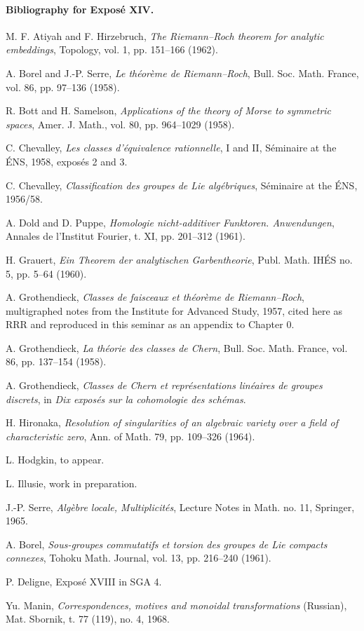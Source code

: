 \documentclass[12pt]{article}
\begin{document}
\paragraph{Bibliography for Exposé XIV.}
\begin{enumerate}[label={[\arabic*]}]
\item M. F. Atiyah and F. Hirzebruch, \emph{The Riemann--Roch theorem for analytic embeddings}, Topology, vol. 1, pp. 151--166 (1962).
\item A. Borel and J.-P. Serre, \emph{Le théorème de Riemann--Roch}, Bull. Soc. Math. France, vol. 86, pp. 97--136 (1958).
\item R. Bott and H. Samelson, \emph{Applications of the theory of Morse to symmetric spaces}, Amer. J. Math., vol. 80, pp. 964--1029 (1958).
\item C. Chevalley, \emph{Les classes d'équivalence rationnelle}, I and II, Séminaire at the ÉNS, 1958, exposés 2 and 3.
\item C. Chevalley, \emph{Classification des groupes de Lie algébriques}, Séminaire at the ÉNS, 1956/58.
\item A. Dold and D. Puppe, \emph{Homologie nicht-additiver Funktoren. Anwendungen}, Annales de l'Institut Fourier, t. XI, pp. 201--312 (1961).
\item H. Grauert, \emph{Ein Theorem der analytischen Garbentheorie}, Publ. Math. IHÉS no. 5, pp. 5--64 (1960).
\item A. Grothendieck, \emph{Classes de faisceaux et théorème de Riemann--Roch}, multigraphed notes from the Institute for Advanced Study, 1957, cited here as RRR and reproduced in this seminar as an appendix to Chapter 0.
\item A. Grothendieck, \emph{La théorie des classes de Chern}, Bull. Soc. Math. France, vol. 86, pp. 137--154 (1958).
\item A. Grothendieck, \emph{Classes de Chern et représentations linéaires de groupes discrets}, in \emph{Dix exposés sur la cohomologie des schémas}.
\item H. Hironaka, \emph{Resolution of singularities of an algebraic variety over a field of characteristic zero}, Ann. of Math. 79, pp. 109--326 (1964).
\item L. Hodgkin, to appear.
\item L. Illusie, work in preparation.
\item J.-P. Serre, \emph{Algèbre locale, Multiplicités}, Lecture Notes in Math. no. 11, Springer, 1965.
\item A. Borel, \emph{Sous-groupes commutatifs et torsion des groupes de Lie compacts connexes}, Tohoku Math. Journal, vol. 13, pp. 216--240 (1961).
\item P. Deligne, Exposé XVIII in SGA 4.
\item Yu. Manin, \emph{Correspondences, motives and monoidal transformations} (Russian), Mat. Sbornik, t. 77 (119), no. 4, 1968.
\end{enumerate}
\end{document}

